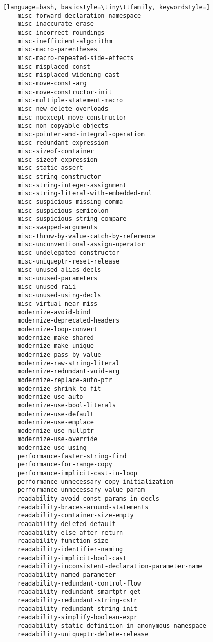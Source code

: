 \documentclass[aspectratio=169]{beamer}
\begin{document}
\begin{lstlisting}[language=bash, basicstyle=\tiny\ttfamily, keywordstyle=]
    misc-forward-declaration-namespace
    misc-inaccurate-erase
    misc-incorrect-roundings
    misc-inefficient-algorithm
    misc-macro-parentheses
    misc-macro-repeated-side-effects
    misc-misplaced-const
    misc-misplaced-widening-cast
    misc-move-const-arg
    misc-move-constructor-init
    misc-multiple-statement-macro
    misc-new-delete-overloads
    misc-noexcept-move-constructor
    misc-non-copyable-objects
    misc-pointer-and-integral-operation
    misc-redundant-expression
    misc-sizeof-container
    misc-sizeof-expression
    misc-static-assert
    misc-string-constructor
    misc-string-integer-assignment
    misc-string-literal-with-embedded-nul
    misc-suspicious-missing-comma
    misc-suspicious-semicolon
    misc-suspicious-string-compare
    misc-swapped-arguments
    misc-throw-by-value-catch-by-reference
    misc-unconventional-assign-operator
    misc-undelegated-constructor
    misc-uniqueptr-reset-release
    misc-unused-alias-decls
    misc-unused-parameters
    misc-unused-raii
    misc-unused-using-decls
    misc-virtual-near-miss
    modernize-avoid-bind
    modernize-deprecated-headers
    modernize-loop-convert
    modernize-make-shared
    modernize-make-unique
    modernize-pass-by-value
    modernize-raw-string-literal
    modernize-redundant-void-arg
    modernize-replace-auto-ptr
    modernize-shrink-to-fit
    modernize-use-auto
    modernize-use-bool-literals
    modernize-use-default
    modernize-use-emplace
    modernize-use-nullptr
    modernize-use-override
    modernize-use-using
    performance-faster-string-find
    performance-for-range-copy
    performance-implicit-cast-in-loop
    performance-unnecessary-copy-initialization
    performance-unnecessary-value-param
    readability-avoid-const-params-in-decls
    readability-braces-around-statements
    readability-container-size-empty
    readability-deleted-default
    readability-else-after-return
    readability-function-size
    readability-identifier-naming
    readability-implicit-bool-cast
    readability-inconsistent-declaration-parameter-name
    readability-named-parameter
    readability-redundant-control-flow
    readability-redundant-smartptr-get
    readability-redundant-string-cstr
    readability-redundant-string-init
    readability-simplify-boolean-expr
    readability-static-definition-in-anonymous-namespace
    readability-uniqueptr-delete-release
  \end{lstlisting}
\end{document}
